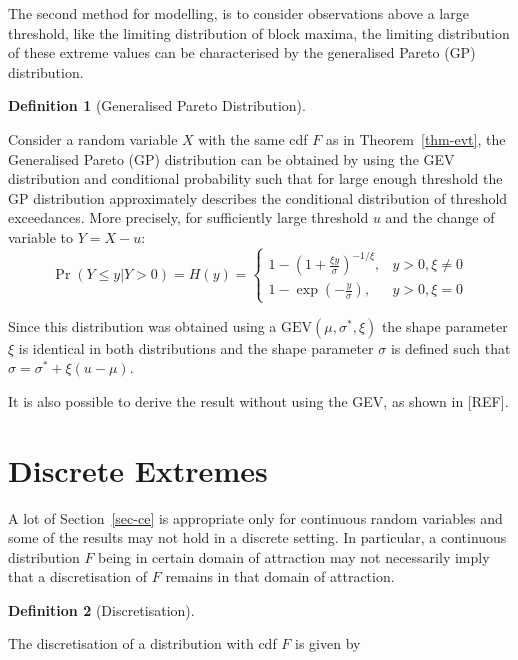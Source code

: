 \documentclass[
  10pt,
  a4paper,
]{scrreprt}
\theoremstyle{definition}
\newtheorem{definition}{Definition}[section]
\theoremstyle{plain}
\theoremstyle{plain}
\theoremstyle{remark}
\begin{document}
{The second method for modelling, is to consider observations above a
large threshold, like the limiting distribution of block maxima, the
limiting distribution of these extreme values can be characterised by
the generalised Pareto (GP) distribution.

\begin{definition}[Generalised Pareto
Distribution]\protect\hypertarget{def-gp}{}\label{def-gp}

Consider a random variable \(X\) with the same cdf \(F\) as in
Theorem~\ref{thm-evt}, the Generalised Pareto (GP) distribution can be
obtained by using the GEV distribution and conditional probability such
that for large enough threshold the GP distribution approximately
describes the conditional distribution of threshold exceedances. More
precisely, for sufficiently large threshold \(u\) and the change of
variable to \(Y=X-u\): \[
\Pr(Y\le y | Y>0) = H(y) = \begin{cases}
1-\left(1+\displaystyle\frac{\xi y}{\sigma}\right)^{-1/\xi},&y>0,\xi\ne 0 \\
1-\exp\left(-\displaystyle\frac{y}{\sigma}\right),&y>0,\xi = 0
\end{cases}
\]

\end{definition}

Since this distribution was obtained using a
\(\text{GEV}(\mu,\sigma^*,\xi)\) the shape parameter \(\xi\) is
identical in both distributions and the shape parameter \(\sigma\) is
defined such that \(\sigma = \sigma^* + \xi(u-\mu)\).

It is also possible to derive the result without using the GEV, as shown
in {[}REF{]}.

\hypertarget{sec-disc}{%
\section{Discrete Extremes}\label{sec-disc}}

A lot of Section~\ref{sec-ce} is appropriate only for continuous random
variables and some of the results may not hold in a discrete setting. In
particular, a continuous distribution \(F\) being in certain domain of
attraction may not necessarily imply that a discretisation of \(F\)
remains in that domain of attraction.

\begin{definition}[Discretisation]\protect\hypertarget{def-disc}{}\label{def-disc}

The discretisation of a distribution with cdf \(F\) is given by


\end{definition}}
\end{document}
